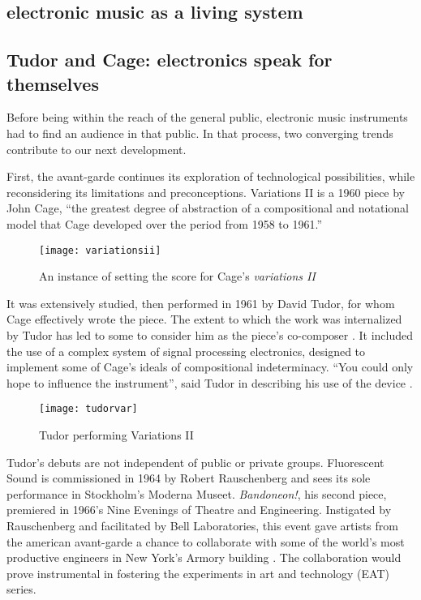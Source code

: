 \begin{itemize}
\section{electronic music as a living system}

\subsection{Tudor and Cage: electronics speak for themselves}

	Before being within the reach of the general public, electronic music instruments had to find an audience in that public. In that process, two converging trends contribute to our next development. 
	
	First, the avant-garde continues its exploration of technological possibilities, while reconsidering its limitations and preconceptions. Variations II is a 1960 piece by John Cage, “the greatest degree of abstraction of a compositional and notational model that Cage developed over the period from 1958 to 1961.”
	
\begin{figure}[h!]
  \caption{An instance of setting the score for Cage's \emph{variations II}}
  \centering
    \texttt{[image: variationsii]}
\end{figure}
	
	 It was extensively studied, then performed in 1961 by David Tudor, for whom Cage effectively wrote the piece. The extent to which the work was internalized by Tudor has led to some to consider him as the piece’s co-composer \citep{pritchett2004}. It included the use of a complex system of signal processing electronics, designed to implement some of Cage’s ideals of compositional indeterminacy. “You could only hope to influence the instrument”, said Tudor in describing his use of the device \citep{nakai2014}. 
	 
 	\begin{figure}[h!]
 	  \caption{Tudor performing Variations II}
 	  \centering
 	    \texttt{[image: tudorvar]}
 	\end{figure}

Tudor’s debuts are not independent of public or private groups. Fluorescent Sound is commissioned in 1964 by Robert Rauschenberg and sees its sole performance in Stockholm’s Moderna Museet. \emph{Bandoneon!}, his second piece, premiered in 1966’s Nine Evenings of Theatre and Engineering. Instigated by Rauschenberg and facilitated by Bell Laboratories, this event gave artists from the american avant-garde a chance to collaborate with some of the world’s most productive engineers in New York’s Armory building \citep{kuivila2004}. The collaboration would prove instrumental in fostering the experiments in art and technology (EAT) series. 
	

\end{itemize}
